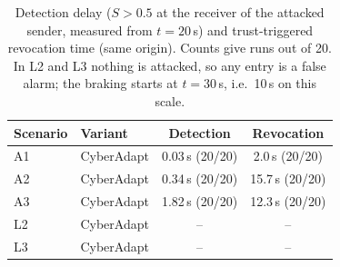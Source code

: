 \begin{table}[!t]\centering\caption{Detection delay ($S>0.5$ at the receiver of the attacked sender, measured from $t=20$\,s) and trust-triggered revocation time (same origin). Counts give runs out of 20. In L2 and L3 nothing is attacked, so any entry is a false alarm; the braking starts at $t=30$\,s, i.e.\ 10\,s on this scale.}\label{tab:det}\footnotesize\setlength{\tabcolsep}{2pt}\begin{tabular}{llcc}\toprule
Scenario & Variant & Detection & Revocation\\\midrule
A1 & CyberAdapt & 0.03\,s (20/20) & 2.0\,s (20/20)\\
A2 & CyberAdapt & 0.34\,s (20/20) & 15.7\,s (20/20)\\
A3 & CyberAdapt & 1.82\,s (20/20) & 12.3\,s (20/20)\\
L2 & CyberAdapt & -- & --\\
L3 & CyberAdapt & -- & --\\
\bottomrule\end{tabular}\end{table}
